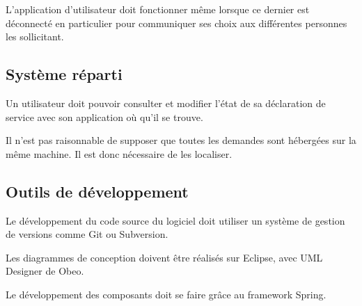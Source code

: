 \begin{requirement}[Persistance]
	L’application d’utilisateur doit fonctionner même lorsque ce dernier est déconnecté en particulier pour communiquer ses choix aux différentes personnes les sollicitant.
\end{requirement}

\subsection{Système réparti}

\begin{requirement}
	Un utilisateur doit pouvoir consulter et modifier l’état de sa déclaration de service avec son application où qu’il se trouve.
\end{requirement}

\begin{requirement}
Il n’est pas raisonnable de supposer que toutes les demandes sont hébergées sur la même machine. Il est donc nécessaire de les localiser.
\end{requirement}

\subsection{Outils de développement}

\begin{requirement}
	Le développement du code source du logiciel doit utiliser un système de gestion de versions comme Git ou Subversion.
\end{requirement}

\begin{requirement}
	Les diagrammes de conception doivent être réalisés sur Eclipse, avec UML Designer de Obeo.
\end{requirement}

\begin{requirement}[Spring]
	Le développement des composants doit se faire grâce au framework Spring.
\end{requirement}

\renewcommand{\listtheoremname}{Liste des exigences}

\listoftheorems[ignoreall,show={requirement}]

